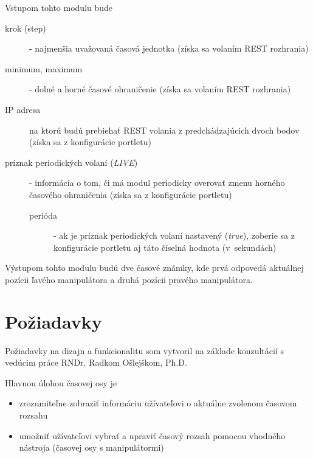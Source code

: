 \documentclass[
  digital, %
  twoside, %
  notable,   %
  nolof,   %
  nolot,   %
]{fithesis3}
\begin{document}
Vstupom tohto modulu bude
\begin{description}
\item[krok (step)] - najmenšia uvažovaná časová jednotka (získa sa volaním REST rozhrania)
\item[minimum, maximum] - dolné a horné časové ohraničenie (získa sa volaním REST rozhrania)
\item[IP adresa] na ktorú budú prebiehať REST volania z predchádzajúcich dvoch bodov (získa sa z konfigurácie portletu)
\item[príznak periodických volaní (\textit{LIVE})] - informácia o tom, či má modul periodicky overovať zmenu horného časového ohraničenia (získa sa z konfigurácie portletu)
\begin{description}
\item[perióda] - ak je príznak periodických volaní nastavený (\textit{true}), zoberie sa z konfigurácie portletu aj táto číselná hodnota (v~sekundách)
\end{description}
\end{description}
Výstupom tohto modulu budú dve časové známky, kde prvá odpovedá aktuálnej pozícii ľavého manipulátora a druhá pozícii pravého manipulátora.

\section{Požiadavky}
\label{requirements}
Požiadavky na dizajn a funkcionalitu som vytvoril na základe konzultácií s vedúcim práce RNDr. Radkom Ošlejškom, Ph.D.

Hlavnou úlohou časovej osy je
\begin{itemize}
\item zrozumiteľne zobraziť informáciu užívateľovi o aktuálne zvolenom časovom rozsahu
\item umožniť užívateľovi vybrať a upraviť časový rozsah pomocou vhodného nástroja (časovej osy s manipulátormi)
\end{itemize}
\end{document}
